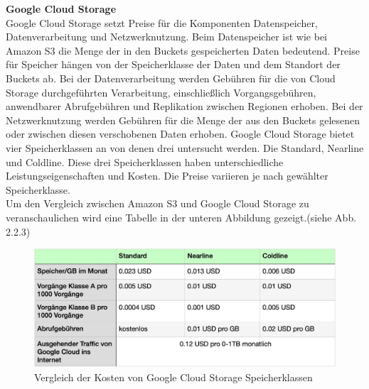 \newpage

\textbf{Google Cloud Storage}\\

Google Cloud Storage setzt Preise für die Komponenten Datenspeicher, Datenverarbeitung und Netzwerknutzung. Beim Datenspeicher ist wie bei Amazon S3 die Menge der in den Buckets gespeicherten Daten bedeutend. Preise für Speicher hängen von der Speicherklasse der Daten und dem Standort der Buckets ab. Bei der Datenverarbeitung werden Gebühren für die von Cloud Storage durchgeführten Verarbeitung, einschließlich Vorgangsgebühren, anwendbarer Abrufgebühren und Replikation zwischen Regionen erhoben. Bei der Netzwerknutzung werden Gebühren für die Menge der aus den Buckets gelesenen oder zwischen diesen verschobenen Daten erhoben. Google Cloud Storage bietet vier Speicherklassen an von denen drei untersucht werden. Die Standard, Nearline und Coldline. Diese drei Speicherklassen haben unterschiedliche Leistungseigenschaften und Kosten. Die Preise variieren je nach gewählter Speicherklasse.\\

Um den Vergleich zwischen Amazon S3 und Google Cloud Storage zu veranschaulichen wird eine Tabelle in der unteren Abbildung gezeigt.(siehe Abb. 2.2.3)

\begin{figure}[h]
	\centering
	\includegraphics[width=12cm,keepaspectratio]{Pictures/GCStorageClassKosten.png}
	\caption{Vergleich der Kosten von Google Cloud Storage Speicherklassen}
\end{figure}

